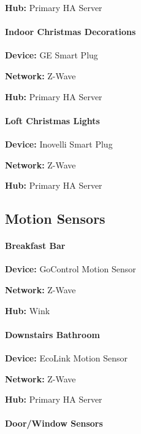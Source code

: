 \documentclass[]{article}
\let\oldparagraph\paragraph
\renewcommand{\paragraph}[1]{\oldparagraph{#1}\mbox{}}
\begin{document}
\textbf{Hub: }
{Primary HA Server}

\paragraph{\texorpdfstring{{Indoor Christmas Decorations}}{Indoor Christmas Decorations}}

\textbf{Device: }
{GE Smart Plug}

\textbf{Network: }
{Z-Wave}

\textbf{Hub: }
{Primary HA Server}

\paragraph{\texorpdfstring{{Loft Christmas Lights}}{Loft Christmas Lights}}

\textbf{Device: }
{Inovelli Smart Plug}

\textbf{Network: }
{Z-Wave}

\textbf{Hub: }
{Primary HA Server}

\subsection{\texorpdfstring{{Motion Sensors}}{Motion Sensors}}

\paragraph{\texorpdfstring{{Breakfast Bar}}{Breakfast Bar}}

\textbf{Device: }
{GoControl Motion Sensor}

\textbf{Network: }
{Z-Wave}

\textbf{Hub: }
{Wink}

\paragraph{\texorpdfstring{{Downstairs Bathroom}}{Downstairs Bathroom}}

\textbf{Device: }
{EcoLink Motion Sensor}

\textbf{Network: }
{Z-Wave}

\textbf{Hub: }
{Primary HA Server}

\paragraph{\texorpdfstring{{Door/Window Sensors}}{Door/Window Sensors}}
\end{document}
